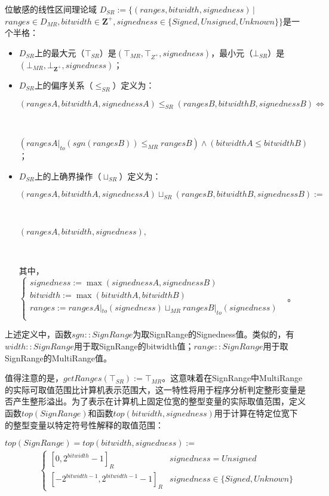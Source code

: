 \begin{definition}
	位敏感的线性区间理论域	$ D_{SR} := \{(ranges, bitwidth,  signedness) \, | \, $\\
	$ ranges \in D_{MR}, bitwidth \in \mathbf{Z^+}, signedness \in \{Signed, Unsigned, Unknown\}\} $是一个半格：
	\begin{itemize}
		\item $ D_{SR} $上的最大元（$ \top_{SR} $）是$ (\top_{MR}, \top_{Z^+}, signedness) $，最小元（$ \bot_{SR} $）是$ (\bot_{MR}, \bot_{\mathbf{Z}^+}, signedness)$；
		
		\item $ D_{SR} $上的偏序关系（$ \le_{SR} $）定义为：\\
			\centerline{$ (rangesA, bitwidthA, signednessA) \le_{SR} (rangesB, bitwidthB, signednessB) \iff $}\\
			\centerline{$ (rangesA |_{to}(sgn(rangesB)) \le_{MR} rangesB) \land (bitwidthA \le bitwidthB) $；}
			
		\item $ D_{SR} $上的上确界操作（$ \sqcup_{SR} $）定义为：\\
			\centerline{$ (rangesA, bitwidthA, signednessA) \sqcup_{SR} (rangesB, bitwidthB, signednessB)  := $}\\
			\centerline{$ (rangesA, bitwidth, signedness) , $}\\
			\centerline{其中，$ \begin{cases}
				signedness := \max(signednessA, signednessB)&\\
				bitwidth := \max(bitwidthA, bitwidthB)&\\
				ranges := rangesA |_{to}(signedness) \sqcup_{MR} rangesB |_{to}(signedness)&\\
				\end{cases}$。}
	\end{itemize}
\end{definition}

上述定义中，函数$ sgn::SignRange$为取SignRange的Signedness值。类似的，有$ width::SignRange $用于取SignRange的bitwidth值；$ range::SignRange $用于取SignRange的MultiRange值。


值得注意的是，$ getRanges(\top_{SR}) := \top_{MR} $。这意味着在SignRange中MultiRange的实际可取值范围比计算机表示范围大，这一特性将用于程序分析判定整形变量是否产生整形溢出。为了表示在计算机上固定位宽的整型变量的实际取值范围，定义函数$ top(SignRange) $和函数$ top(bitwidth, signedness) $用于计算在特定位宽下的整型变量以特定符号性解释的取值范围：

$ top(SignRange)  = top(bitwidth, signedness):=  $
\begin{align}
	\quad\quad\quad\begin{cases}
		[0, 2^{bitwidth} - 1]_{R} & signedness = Unsigned\\
		[-2^{bitwidth - 1}, 2^{bitwidth - 1} - 1]_{R} & signedness \in \{Signed, Unknown\}
	\end{cases}
\end{align}

